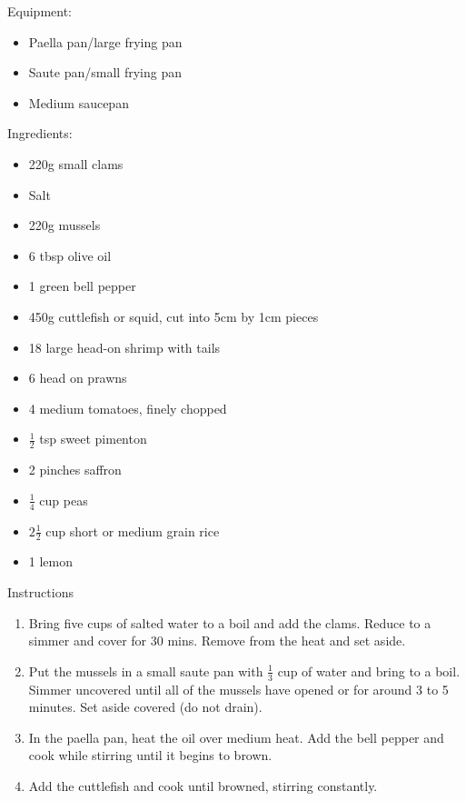 \documentclass[a4paper, oneside]{book}
\begin{document}
\begin{multicols}{2}
    Equipment:

    {\begin{itemize}
        \item Paella pan/large frying pan
        \item Saute pan/small frying pan
        \item Medium saucepan
    \end{itemize}}
    Ingredients:
    {\begin{itemize}
        \item 220g small clams
        \item Salt
        \item 220g mussels
        \item 6 tbsp olive oil
        \item 1 green bell pepper
        \item 450g cuttlefish or squid, cut into 5cm by 1cm pieces
        \item 18 large head-on shrimp with tails
        \item 6 head on prawns
        \item 4 medium tomatoes, finely chopped
        \item \(\frac{1}{2}\) tsp sweet pimenton
        \item 2 pinches saffron
        \item \(\frac{1}{4}\) cup peas
        \item \(2\frac{1}{2}\) cup short or medium grain rice
        \item 1 lemon
    \end{itemize}}
    Instructions
    {\begin{enumerate}
        \item 
            Bring five cups of salted water to a boil and add the clams. Reduce
            to a simmer and cover for 30 mins. Remove from the heat and set
            aside.
        \item
            Put the mussels in a small saute pan with \(\frac{1}{3}\) cup of
            water and bring to a boil. Simmer uncovered until all of the
            mussels have opened or for around 3 to 5 minutes. Set aside covered
            (do not drain).
        \item
            In the paella pan, heat the oil over medium heat. Add the bell
            pepper and cook while stirring until it begins to brown.
        \item
            Add the cuttlefish and cook until browned, stirring constantly.

\end{enumerate}}
\end{multicols}
\end{document}
